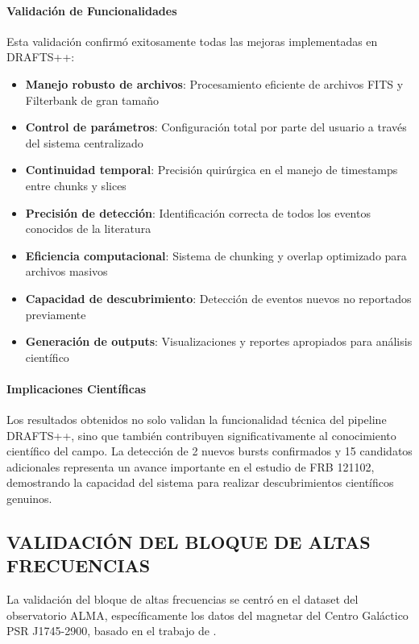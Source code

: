 \paragraph{Validación de Funcionalidades}

Esta validación confirmó exitosamente todas las mejoras implementadas en DRAFTS++:

\begin{itemize}
    \item \textbf{Manejo robusto de archivos}: Procesamiento eficiente de archivos FITS y Filterbank de gran tamaño
    \item \textbf{Control de parámetros}: Configuración total por parte del usuario a través del sistema centralizado
    \item \textbf{Continuidad temporal}: Precisión quirúrgica en el manejo de timestamps entre chunks y slices
    \item \textbf{Precisión de detección}: Identificación correcta de todos los eventos conocidos de la literatura
    \item \textbf{Eficiencia computacional}: Sistema de chunking y overlap optimizado para archivos masivos
    \item \textbf{Capacidad de descubrimiento}: Detección de eventos nuevos no reportados previamente
    \item \textbf{Generación de outputs}: Visualizaciones y reportes apropiados para análisis científico
\end{itemize}

\paragraph{Implicaciones Científicas}

Los resultados obtenidos no solo validan la funcionalidad técnica del pipeline DRAFTS++, sino que también contribuyen significativamente al conocimiento científico del campo. La detección de 2 nuevos bursts confirmados y 15 candidatos adicionales representa un avance importante en el estudio de FRB 121102, demostrando la capacidad del sistema para realizar descubrimientos científicos genuinos.

\subsection{VALIDACIÓN DEL BLOQUE DE ALTAS FRECUENCIAS}

La validación del bloque de altas frecuencias se centró en el dataset del observatorio ALMA, específicamente los datos del magnetar del Centro Galáctico PSR J1745-2900, basado en el trabajo de \cite{veracasanova2025}. 

